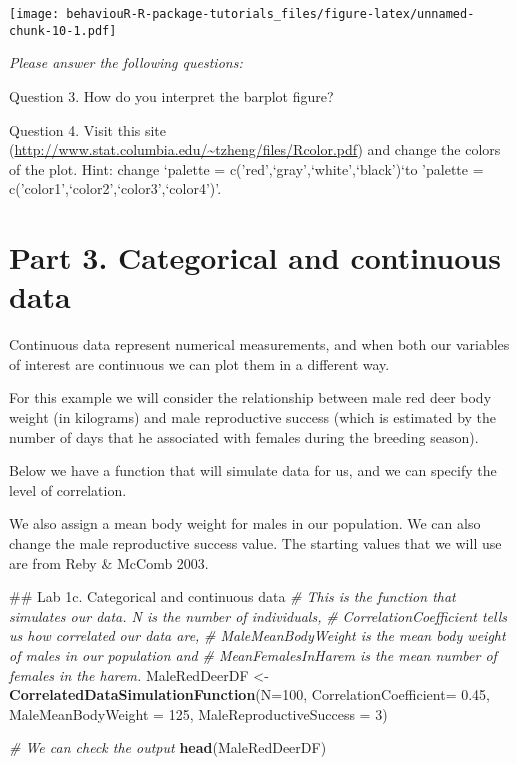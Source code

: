 \documentclass[]{book}
\newenvironment{Shaded}{\begin{snugshade}}{\end{snugshade}}
\newcommand{\CommentTok}[1]{\textcolor[rgb]{0.56,0.35,0.01}{\textit{#1}}}
\newcommand{\DataTypeTok}[1]{\textcolor[rgb]{0.13,0.29,0.53}{#1}}
\newcommand{\DecValTok}[1]{\textcolor[rgb]{0.00,0.00,0.81}{#1}}
\newcommand{\FloatTok}[1]{\textcolor[rgb]{0.00,0.00,0.81}{#1}}
\newcommand{\KeywordTok}[1]{\textcolor[rgb]{0.13,0.29,0.53}{\textbf{#1}}}
\newcommand{\NormalTok}[1]{#1}
\newcommand{\StringTok}[1]{\textcolor[rgb]{0.31,0.60,0.02}{#1}}
\begin{document}
\texttt{[image: behaviouR-R-package-tutorials\_files/figure-latex/unnamed-chunk-10-1.pdf]}

\emph{Please answer the following questions:}

Question 3. How do you interpret the barplot figure?

Question 4. Visit this site (\url{http://www.stat.columbia.edu/~tzheng/files/Rcolor.pdf}) and change the colors of the plot. Hint: change `palette = c('red',`gray',`white',`black')`to 'palette = c('color1',`color2',`color3',`color4')'.

\hypertarget{part-3.-categorical-and-continuous-data}{%
\section*{Part 3. Categorical and continuous data}\label{part-3.-categorical-and-continuous-data}}

Continuous data represent numerical measurements, and when both our variables of interest are continuous we can plot them in a different way.

For this example we will consider the relationship between male red deer body weight (in kilograms) and male reproductive success (which is estimated by the number of days that he associated with females during the breeding season).

Below we have a function that will simulate data for us, and we can specify the level of correlation.

We also assign a mean body weight for males in our population. We can also change the male reproductive success value. The starting values that we will use are from Reby \& McComb 2003.

\begin{Shaded}
\begin{Highlighting}[]
\NormalTok{## Lab 1c. Categorical and continuous data}
\CommentTok{# This is the function that simulates our data. N is the number of individuals,   }
\CommentTok{# CorrelationCoefficient tells us how correlated our data are,  }
\CommentTok{# MaleMeanBodyWeight is the mean body weight of males in our population and }
\CommentTok{# MeanFemalesInHarem is the mean number of females in the harem.}
\NormalTok{MaleRedDeerDF <-}\StringTok{ }\KeywordTok{CorrelatedDataSimulationFunction}\NormalTok{(}\DataTypeTok{N=}\DecValTok{100}\NormalTok{, }
                                                  \DataTypeTok{CorrelationCoefficient=} \FloatTok{0.45}\NormalTok{,}
                                                  \DataTypeTok{MaleMeanBodyWeight =} \DecValTok{125}\NormalTok{,}
                                                  \DataTypeTok{MaleReproductiveSuccess =} \DecValTok{3}\NormalTok{)}

\CommentTok{# We can check the output}
\KeywordTok{head}\NormalTok{(MaleRedDeerDF)}
\end{Highlighting}
\end{Shaded}
\end{document}
